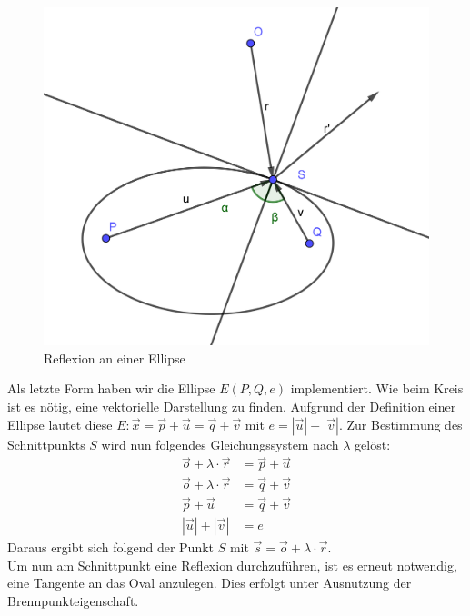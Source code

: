 \documentclass[reducespace,stylepage,semiarbeit]{spezidoc}
\begin{document}
\begin{figure}
\includegraphics[scale=0.7]{pictures/OvalRef.png}
\caption{Reflexion an einer Ellipse}
\label{fig:Ellipse}
\end{figure}
Als letzte Form haben wir die Ellipse $E(P, Q, e)$ implementiert.
Wie beim Kreis ist es nötig, eine vektorielle Darstellung zu finden. 
Aufgrund der Definition einer Ellipse lautet diese $E: \vec{x} = \vec{p} + \vec{u} = \vec{q} + \vec{v}$ mit $ e = |\vec{u}| + |\vec{v}|$.
Zur Bestimmung des Schnittpunkts $S$ wird nun folgendes Gleichungssystem nach $\lambda$ gelöst:
\begin{equation*}
\begin{split}
\vec{o} + \lambda \cdot \vec{r} &= \vec{p} + \vec{u} \\
\vec{o} + \lambda \cdot \vec{r} &= \vec{q} + \vec{v} \\
\vec{p} + \vec{u} &= \vec{q} + \vec{v} \\
|\vec{u}| + |\vec{v}| &= e
\end{split}
\end{equation*}
Daraus ergibt sich folgend der Punkt $S$ mit $\vec{s} = \vec{o} + \lambda \cdot \vec{r}$.\\
Um nun am Schnittpunkt eine Reflexion durchzuführen, ist es erneut notwendig, eine Tangente an das Oval anzulegen. 
Dies erfolgt unter Ausnutzung der Brennpunkteigenschaft. %
\end{document}
